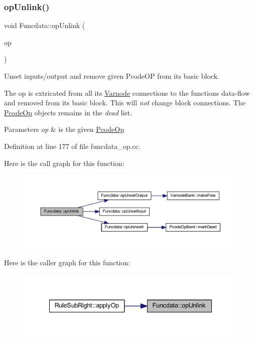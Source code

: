 \subsubsection{\texorpdfstring{opUnlink()}{opUnlink()}}
{\footnotesize\ttfamily void Funcdata\+::op\+Unlink (\begin{DoxyParamCaption}\item[{\mbox{\hyperlink{class_pcode_op}{Pcode\+Op}} $\ast$}]{op }\end{DoxyParamCaption})}



Unset inputs/output and remove given Pcode\+OP from its basic block. 

The op is extricated from all its \mbox{\hyperlink{class_varnode}{Varnode}} connections to the functions data-\/flow and removed from its basic block. This will {\itshape not} change block connections. The \mbox{\hyperlink{class_pcode_op}{Pcode\+Op}} objects remains in the {\itshape dead} list. 
\begin{DoxyParams}{Parameters}
{\em op} & is the given \mbox{\hyperlink{class_pcode_op}{Pcode\+Op}} \\
\hline
\end{DoxyParams}


Definition at line 177 of file funcdata\+\_\+op.\+cc.

Here is the call graph for this function\+:
\nopagebreak
\begin{figure}[H]
\begin{center}
\leavevmode
\includegraphics[width=350pt]{class_funcdata_a495ebac694bc98d041e29ce05eece6f9_cgraph}
\end{center}
\end{figure}
Here is the caller graph for this function\+:
\nopagebreak
\begin{figure}[H]
\begin{center}
\leavevmode
\includegraphics[width=335pt]{class_funcdata_a495ebac694bc98d041e29ce05eece6f9_icgraph}
\end{center}
\end{figure}
\mbox{\label{class_funcdata_a16f821f09d862b3c908d2bce7530b90a}} 
